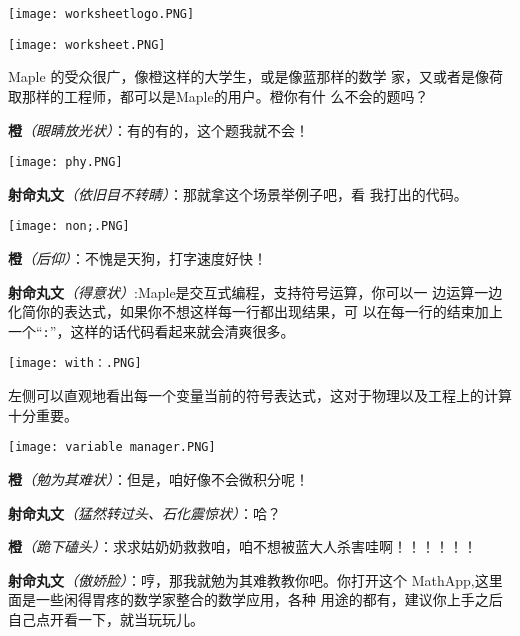 \begin{multicols}{2}
    \begin{center}
        \texttt{[image: worksheetlogo.PNG]}
    \end{center}

    \begin{center}
        \texttt{[image: worksheet.PNG]}
    \end{center}

    Maple 的受众很广，像橙这样的大学生，或是像蓝那样的数学 家，又或者是像荷取那样的工程师，都可以是Maple的用户。橙你有什 么不会的题吗？

    \textbf{橙}\textit{（眼睛放光状）}：有的有的，这个题我就不会！
    \begin{center}
        \texttt{[image: phy.PNG]}
    \end{center}

    \textbf{射命丸文}\textit{（依旧目不转睛）}：那就拿这个场景举例子吧，看
    我打出的代码。

    \begin{center}
        \texttt{[image: non;.PNG]}
    \end{center}

    \textbf{橙}\textit{（后仰）}：不愧是天狗，打字速度好快！

    \textbf{射命丸文}\textit{（得意状）}:Maple是交互式编程，支持符号运算，你可以一
    边运算一边化简你的表达式，如果你不想这样每一行都出现结果，可
    以在每一行的结束加上一个“\verb":"”，这样的话代码看起来就会清爽很多。

    \begin{center}
        \texttt{[image: with：.PNG]}
    \end{center}

    左侧可以直观地看出每一个变量当前的符号表达式，这对于物理以及工程上的计算十分重要。

    \begin{center}
        \texttt{[image: variable manager.PNG]}
    \end{center}

    \textbf{橙}\textit{（勉为其难状）}：但是，咱好像不会微积分呢！

    \textbf{射命丸文}\textit{（猛然转过头、石化震惊状）}：哈？

    \textbf{橙}\textit{（跪下磕头）}：求求姑奶奶救救咱，咱不想被蓝大人杀害哇啊！！！！！！

    \textbf{射命丸文}\textit{（傲娇脸）}：哼，那我就勉为其难教教你吧。你打开这个
    MathApp,这里面是一些闲得胃疼的数学家整合的数学应用，各种
    用途的都有，建议你上手之后自己点开看一下，就当玩玩儿。


\end{multicols}
